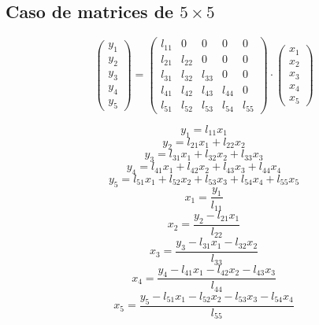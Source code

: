 \documentclass[10pt,a4paper,dvipdfmx]{article}
\begin{document}
\subsection{Caso de matrices de $5\times 5$ }
$$ \left( 
\begin{array}{c}
y_{1} \\
y_{2} \\
y_{3} \\
y_{4} \\
y_{5} 
 \end{array}
\right)
 = \left( 
\begin{array}{ccccc}
l_{{1}{1}} & 0 & 0 & 0 & 0 \\
l_{{2}{1}} & l_{{2}{2}} & 0 & 0 & 0 \\
l_{{3}{1}} & l_{{3}{2}} & l_{{3}{3}} & 0 & 0 \\
l_{{4}{1}} & l_{{4}{2}} & l_{{4}{3}} & l_{{4}{4}} & 0 \\
l_{{5}{1}} & l_{{5}{2}} & l_{{5}{3}} & l_{{5}{4}} & l_{{5}{5}} 
 \end{array}
\right)
 \cdot \left( 
\begin{array}{c}
x_{1} \\
x_{2} \\
x_{3} \\
x_{4} \\
x_{5} 
 \end{array}
\right)
 $$
\begin{multicols}{2}
$$ y_{1} = l_{{1}{1}} x_{1} $$
$$ y_{2} = l_{{2}{1}} x_{1} + l_{{2}{2}} x_{2} $$
$$ y_{3} = l_{{3}{1}} x_{1} + l_{{3}{2}} x_{2} + l_{{3}{3}} x_{3} $$
$$ y_{4} = l_{{4}{1}} x_{1} + l_{{4}{2}} x_{2} + l_{{4}{3}} x_{3} + l_{{4}{4}} x_{4} $$
$$ y_{5} = l_{{5}{1}} x_{1} + l_{{5}{2}} x_{2} + l_{{5}{3}} x_{3} + l_{{5}{4}} x_{4} + l_{{5}{5}} x_{5} $$
\vfill\null
\columnbreak
$$ x_{1} = \dfrac{y_{1}}{l_{{1}{1}}} $$
$$ x_{2} = \dfrac{y_{2}- l_{{2}{1}} x_{1}}{l_{{2}{2}}} $$
$$ x_{3} = \dfrac{y_{3}- l_{{3}{1}} x_{1}- l_{{3}{2}} x_{2}}{l_{{3}{3}}} $$
$$ x_{4} = \dfrac{y_{4}- l_{{4}{1}} x_{1}- l_{{4}{2}} x_{2}- l_{{4}{3}} x_{3}}{l_{{4}{4}}} $$
$$ x_{5} = \dfrac{y_{5}- l_{{5}{1}} x_{1}- l_{{5}{2}} x_{2}- l_{{5}{3}} x_{3}- l_{{5}{4}} x_{4}}{l_{{5}{5}}} $$
\end{multicols}
\end{document}
